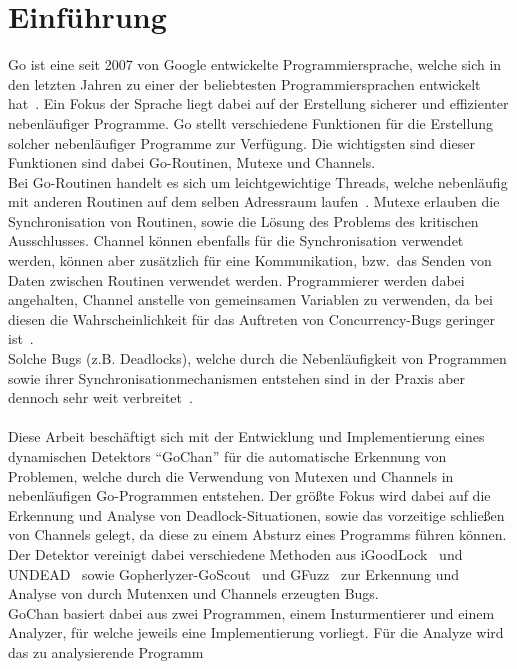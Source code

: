 \chapter{Einführung}\label{chap:introduction}
Go ist eine seit 2007 von Google entwickelte Programmiersprache, welche sich 
in den letzten Jahren zu einer der beliebtesten Programmiersprachen entwickelt 
hat~\cite{ranking}. Ein Fokus der Sprache liegt dabei auf der Erstellung
sicherer und effizienter nebenläufiger Programme. Go stellt verschiedene 
Funktionen für die Erstellung solcher nebenläufiger Programme zur Verfügung.
Die wichtigsten sind dieser Funktionen sind dabei Go-Routinen, Mutexe und 
Channels.\\Bei Go-Routinen handelt es sich um leichtgewichtige Threads, welche 
nebenläufig mit anderen Routinen auf dem selben Adressraum laufen~\cite{effectiveGo}.
Mutexe erlauben die Synchronisation von Routinen, sowie die Lösung des Problems 
des kritischen Ausschlusses. 
Channel können ebenfalls für die Synchronisation verwendet werden,
können aber zusätzlich für eine Kommunikation, bzw.\ das Senden von Daten zwischen 
Routinen verwendet werden. Programmierer werden dabei angehalten, Channel
anstelle von gemeinsamen Variablen zu verwenden, da bei diesen die Wahrscheinlichkeit
für das Auftreten von Concurrency-Bugs geringer ist~\cite{sharedMemory}.\\
Solche Bugs (z.B. Deadlocks), welche durch die Nebenläufigkeit von Programmen sowie ihrer 
Synchronisationmechanismen entstehen sind in der Praxis aber dennoch sehr weit 
verbreitet~\cite{numberBugs}.\\\\
Diese Arbeit beschäftigt sich mit der Entwicklung und Implementierung
eines dynamischen Detektors ``GoChan'' für die automatische Erkennung
von Problemen, welche durch die Verwendung von Mutexen und Channels 
in nebenläufigen Go-Programmen entstehen. Der größte Fokus wird dabei 
auf die Erkennung und Analyse von Deadlock-Situationen, sowie das vorzeitige 
schließen von Channels gelegt, da diese zu einem Absturz eines Programms 
führen können. Der Detektor vereinigt dabei verschiedene Methoden aus 
iGoodLock~\cite{iGoodLock} und UNDEAD~\cite{Undead} sowie 
Gopherlyzer-GoScout~\cite{PPDP18} und GFuzz~\cite{gfuzz} zur 
Erkennung und Analyse von 
durch Mutenxen und Channels erzeugten Bugs.\\
GoChan basiert dabei aus zwei Programmen, einem Insturmentierer und einem 
Analyzer, für welche jeweils eine 
Implementierung vorliegt. Für die Analyze wird das zu analysierende Programm 
